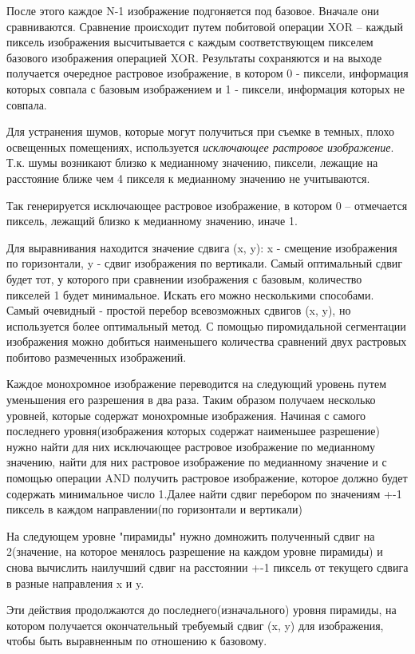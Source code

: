     После этого каждое N-1 изображение подгоняется под базовое. Вначале они сравниваются. Сравнение происходит путем побитовой операции XOR -- каждый пиксель изображения высчитывается с каждым соответствующем пикселем базового изображения операцией XOR. Результаты сохраняются и на выходе получается очередное растровое изображение, в котором 0 - пиксели, информация которых совпала с базовым изображением и 1 - пиксели, информация которых не совпала.

Для устранения шумов, которые могут получиться при съемке в темных, плохо освещенных помещениях, используется \textit{исключающее растровое изображение}. Т.к. шумы возникают близко к медианному значению, пиксели, лежащие на расстояние ближе чем 4 пикселя к медианному значению не учитываются. 

Так генерируется исключающее растровое изображение, в котором 0 -- отмечается пиксель, лежащий близко к медианному значению, иначе 1.

    Для выравнивания находится значение сдвига (x, y): x - смещение изображения по горизонтали, y - сдвиг изображения по вертикали.
Самый оптимальный сдвиг будет тот, у которого при сравнении изображения с базовым, количество пикселей 1 будет минимальное. Искать его можно несколькими способами. Самый очевидный - простой перебор всевозможных сдвигов (x, y), но используется более оптимальный метод. С помощью пиромидальной сегментации изображения\cite{bib6} можно добиться наименьшего количества сравнений двух растровых побитово размеченных изображений.

Каждое монохромное изображение переводится на следующий уровень путем уменьшения его разрешения в два раза. Таким образом получаем несколько уровней, которые содержат монохромные изображения. Начиная с самого последнего уровня(изображения которых содержат наименьшее разрешение) нужно найти для них исключающее растровое изображение по медианному значению, найти для них растровое изображение по медианному значение и с помощью операции AND получить растровое изображение, которое должно будет содержать минимальное число 1.Далее найти сдвиг перебором по значениям +-1 пиксель в каждом направлении(по горизонтали и вертикали)

На следующем уровне "пирамиды" нужно домножить полученный сдвиг на 2(значение, на которое менялось разрешение на каждом уровне пирамиды) и снова вычислить наилучший сдвиг на расстоянии +-1 пиксель от текущего сдвига в разные направления x и y.

Эти действия продолжаются до последнего(изначального) уровня пирамиды, на котором получается окончательный требуемый сдвиг (x, y) для изображения, чтобы быть выравненным по отношению к базовому.

